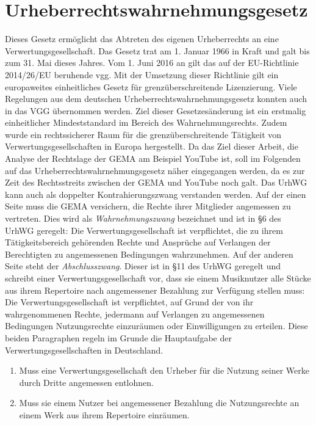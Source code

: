 \section{Urheberrechtswahrnehmungsgesetz}
\label{vgg}
Dieses Gesetz ermöglicht das Abtreten des eigenen Urheberrechts an eine Verwertungsgesellschaft. Das Gesetz trat am 1. Januar 1966 in Kraft und galt bis zum 31. Mai dieses Jahres. Vom 1. Juni 2016 an gilt das auf der EU-Richtlinie 2014/26/EU beruhende \gls{vgg}. Mit der Umsetzung dieser Richtlinie gilt ein europaweites einheitliches Gesetz für grenzüberschreitende Lizenzierung. Viele Regelungen aus dem deutschen Urheberrechtswahrnehmungsgesetz konnten auch in das VGG übernommen werden. Ziel dieser Gesetzesänderung ist ein erstmalig einheitlicher Mindeststandard im Bereich des Wahrnehmungsrechts. Zudem wurde ein rechtssicherer Raum für die grenzüberschreitende Tätigkeit von Verwertungsgesellschaften in Europa hergestellt.
\newline
\newline
Da das Ziel dieser Arbeit, die Analyse der Rechtslage der GEMA am Beispiel YouTube ist, soll im Folgenden auf das Urheberrechtswahrnehmungsgesetz näher eingegangen werden, da es zur Zeit des Rechtsstreits zwischen der GEMA und YouTube noch galt. 
\newline
\newline
Das UrhWG kann auch als doppelter Kontrahierungszwang verstanden werden. Auf der einen Seite muss die GEMA versichern, die Rechte ihrer Mitglieder angemessen zu vertreten. Dies wird als \textit{Wahrnehmungszwang} bezeichnet und ist in §6 des UrhWG geregelt: \glqq Die Verwertungsgesellschaft ist verpflichtet, die zu ihrem Tätigkeitsbereich gehörenden Rechte und Ansprüche auf Verlangen der Berechtigten zu angemessenen Bedingungen wahrzunehmen.\grqq{}
\newline
Auf der anderen Seite steht der \textit{Abschlusszwang}. Dieser ist in §11 des UrhWG geregelt und schreibt einer Verwertungsgesellschaft vor, dass sie einem Musiknutzer alle Stücke aus ihrem Repertoire nach angemessener Bezahlung zur Verfügung stellen muss: \glqq Die Verwertungsgesellschaft ist verpflichtet, auf Grund der von ihr wahrgenommenen Rechte, jedermann auf Verlangen zu angemessenen Bedingungen Nutzungsrechte einzuräumen oder Einwilligungen zu erteilen.\grqq{}
\newline
\newline
Diese beiden Paragraphen regeln im Grunde die Hauptaufgabe der Verwertungsgesellschaften in Deutschland.
\begin{enumerate}
\item Muss eine Verwertungsgesellschaft den Urheber für die Nutzung seiner Werke durch Dritte angemessen entlohnen.
\item Muss sie einem Nutzer bei angemessener Bezahlung die Nutzungsrechte an einem Werk aus ihrem Repertoire einräumen. 
\end{enumerate} 
